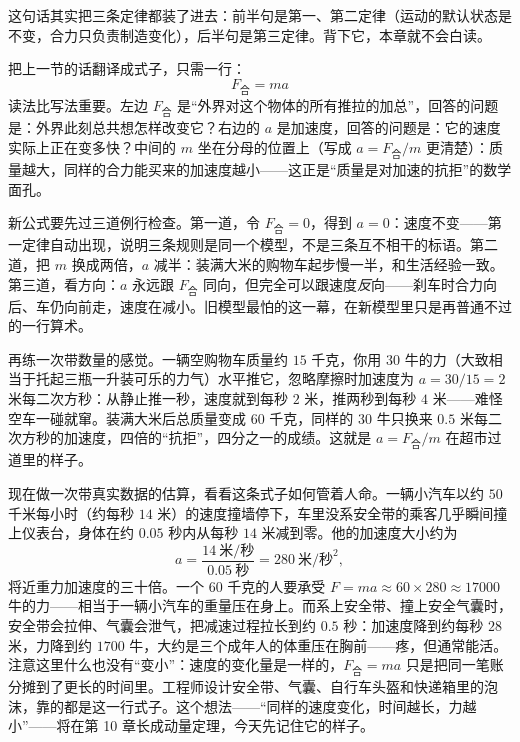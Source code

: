 这句话其实把三条定律都装了进去：前半句是第一、第二定律（运动的默认状态是不变，合力只负责制造变化），后半句是第三定律。背下它，本章就不会白读。


\begin{mainline}
把上一节的话翻译成式子，只需一行：
\[
  F_{\text{合}} = ma
\]
读法比写法重要。左边 \(F_{\text{合}}\) 是“外界对这个物体的所有推拉的加总”，回答的问题是：外界此刻总共想怎样改变它？右边的 \(a\) 是加速度，回答的问题是：它的速度实际上正在变多快？中间的 \(m\) 坐在分母的位置上（写成 \(a=F_{\text{合}}/m\) 更清楚）：质量越大，同样的合力能买来的加速度越小——这正是“质量是对加速的抗拒”的数学面孔。

新公式要先过三道例行检查。第一道，令 \(F_{\text{合}}=0\)，得到 \(a=0\)：速度不变——第一定律自动出现，说明三条规则是同一个模型，不是三条互不相干的标语。第二道，把 \(m\) 换成两倍，\(a\) 减半：装满大米的购物车起步慢一半，和生活经验一致。第三道，看方向：\(a\) 永远跟 \(F_{\text{合}}\) 同向，但完全可以跟速度\emph{反}向——刹车时合力向后、车仍向前走，速度在减小。旧模型最怕的这一幕，在新模型里只是再普通不过的一行算术。

再练一次带数量的感觉。一辆空购物车质量约 \(15\) 千克，你用 \(30\) 牛的力（大致相当于托起三瓶一升装可乐的力气）水平推它，忽略摩擦时加速度为 \(a=30/15=2\) 米每二次方秒：从静止推一秒，速度就到每秒 \(2\) 米，推两秒到每秒 \(4\) 米——难怪空车一碰就窜。装满大米后总质量变成 \(60\) 千克，同样的 \(30\) 牛只换来 \(0.5\) 米每二次方秒的加速度，四倍的“抗拒”，四分之一的成绩。这就是 \(a=F_{\text{合}}/m\) 在超市过道里的样子。
\end{mainline}

现在做一次带真实数据的估算，看看这条式子如何管着人命。一辆小汽车以约 \(50\) 千米每小时（约每秒 \(14\) 米）的速度撞墙停下，车里没系安全带的乘客几乎瞬间撞上仪表台，身体在约 \(0.05\) 秒内从每秒 \(14\) 米减到零。他的加速度大小约为
\[
  a = \frac{14\ \text{米/秒}}{0.05\ \text{秒}} = 280\ \text{米/秒}^2,
\]
将近重力加速度的三十倍。一个 \(60\) 千克的人要承受 \(F=ma\approx 60\times 280 \approx 17000\) 牛的力——相当于一辆小汽车的重量压在身上。而系上安全带、撞上安全气囊时，安全带会拉伸、气囊会泄气，把减速过程拉长到约 \(0.5\) 秒：加速度降到约每秒 \(28\) 米，力降到约 \(1700\) 牛，大约是三个成年人的体重压在胸前——疼，但通常能活。注意这里什么也没有“变小”：速度的变化量是一样的，\(F_{\text{合}}=ma\) 只是把同一笔账分摊到了更长的时间里。工程师设计安全带、气囊、自行车头盔和快递箱里的泡沫，靠的都是这一行式子。这个想法——“同样的速度变化，时间越长，力越小”——将在第 10 章长成动量定理，今天先记住它的样子。

